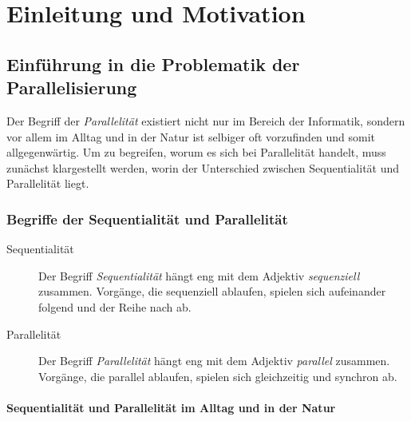 
\chapter{Einleitung und Motivation}

	\section{Einführung in die Problematik der Parallelisierung}

	Der Begriff der \textit{Parallelität} existiert nicht nur im Bereich der Informatik, sondern vor allem im Alltag und in der Natur ist selbiger oft vorzufinden und somit allgegenwärtig. Um zu begreifen, worum es sich bei Parallelität handelt, muss zunächst klargestellt werden, worin der Unterschied zwischen Sequentialität und Parallelität liegt.

		\subsection{Begriffe der Sequentialität und Parallelität}

			\begin{description}
			  \item[Sequentialität]
				  Der Begriff \textit{Sequentialität} hängt eng mit dem Adjektiv \textit{sequenziell} zusammen. Vorgänge, die sequenziell ablaufen, spielen sich aufeinander folgend und der Reihe nach ab. \cite{SequentiellDuden}
			  \item[Parallelität]
				  Der Begriff \textit{Parallelität} hängt eng mit dem Adjektiv \textit{parallel} zusammen. Vorgänge, die parallel ablaufen, spielen sich gleichzeitig und synchron ab. \cite{ParallelDuden}
			\end{description}

			\subsubsection{Sequentialität und Parallelität im Alltag und in der Natur}
			
